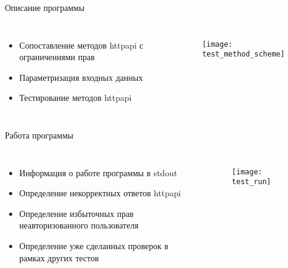 \begin{frame}{Описание программы}
    \begin{columns}
            \begin{itemize}
                \item Сопоставление методов httpapi с ограничениями прав
                \item Параметризация входных данных
                \item Тестирование методов httpapi
            \end{itemize}
            \begin{figure}[h!]
                \centering
                \texttt{[image: test\_method\_scheme]}
                \label{img:test_method_scheme}
            \end{figure}
    \end{columns}
\end{frame}

\begin{frame}{Работа программы}
    \begin{columns}
            \begin{itemize}
                \item Информация о работе программы в stdout
                \item Определение некорректных ответов httpapi
                \item Определение избыточных прав неавторизованного пользователя
                \item Определение уже сделанных проверок в рамках других тестов
            \end{itemize}
            \begin{figure}[h!]
                \centering
                \texttt{[image: test\_run]}
                \label{img:test_run}
            \end{figure}
    \end{columns}
\end{frame}

